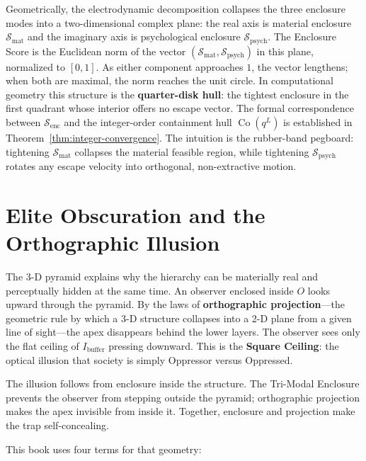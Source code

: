 Geometrically, the electrodynamic decomposition collapses the three enclosure
modes into a two-dimensional complex plane: the real axis is material enclosure
$\mathcal{S}_{\text{mat}}$ and the imaginary axis is psychological enclosure
$\mathcal{S}_{\text{psych}}$. The Enclosure Score is the Euclidean norm of the
vector $(\mathcal{S}_{\text{mat}}, \mathcal{S}_{\text{psych}})$ in this plane,
normalized to $[0,1]$. As either component approaches $1$, the vector lengthens;
when both are maximal, the norm reaches the unit circle. In computational
geometry this structure is the \textbf{quarter-disk hull}: the tightest enclosure
in the first quadrant whose interior offers no escape vector. The formal
correspondence between $\mathcal{S}_{\text{enc}}$ and the integer-order
containment hull $\operatorname{Co}(q^L)$ is established in
Theorem~\ref{thm:integer-convergence}. The intuition is the rubber-band
pegboard: tightening $\mathcal{S}_{\text{mat}}$ collapses the material feasible
region, while tightening $\mathcal{S}_{\text{psych}}$ rotates any escape
velocity into orthogonal, non-extractive motion.

\section{Elite Obscuration and the Orthographic Illusion}
\label{sec:system_init_optics}

The 3-D pyramid explains why the hierarchy can be materially real and
perceptually hidden at the same time. An observer enclosed inside $O$ looks
upward through the pyramid. By the laws of \textbf{orthographic projection}---the
geometric rule by which a 3-D structure collapses into a 2-D plane from a given
line of sight---the apex disappears behind the lower layers. The observer sees
only the flat ceiling of $I_{\text{buffer}}$ pressing downward. This is the
\textbf{Square Ceiling}: the optical illusion that society is simply Oppressor
versus Oppressed.

The illusion follows from enclosure inside the structure. The Tri-Modal Enclosure prevents the
observer from stepping outside the pyramid; orthographic projection makes the
apex invisible from inside it. Together, enclosure and projection make the trap
self-concealing.

This book uses four terms for that geometry:

